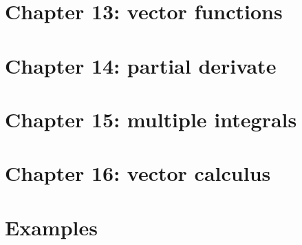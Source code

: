 \documentclass{article}
\begin{document}
\section{Chapter 13: vector functions}

\section{Chapter 14: partial derivate}

\section{Chapter 15: multiple integrals}

\section{Chapter 16: vector calculus}

\section{Examples}
\end{document}
